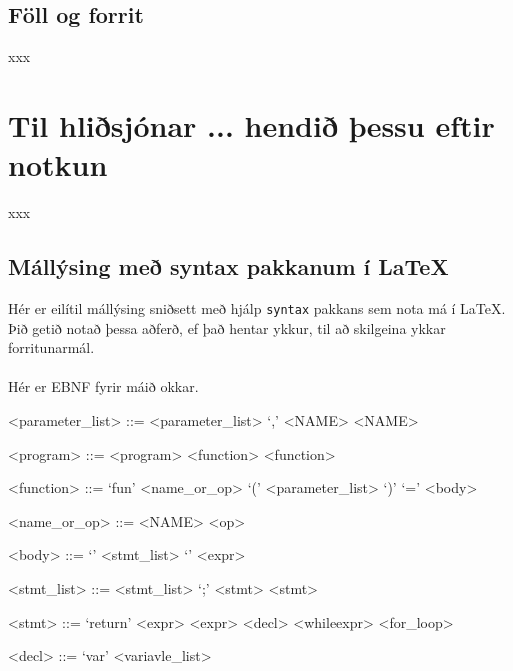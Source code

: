 \documentclass[12pt,a4paper]{article}
\begin{document}
\subsection{Föll og forrit}
xxx
\section{Til hliðsjónar ... hendið þessu eftir notkun}
xxx
\subsection{Mállýsing með syntax pakkanum í LaTeX}

Hér er eilítil mállýsing sniðsett með hjálp {\tt syntax} pakkans sem
nota má í \LaTeX. Þið getið notað þessa aðferð, ef það hentar ykkur,
til að skilgeina ykkar forritunarmál.
\\
\\
Hér er EBNF fyrir máið okkar.

\begin{grammar}
<parameter_list> ::= <parameter_list> `,' <NAME>
	\alt <NAME>
	\alt \epsilon
\end{grammar}

\begin{grammar}
<program> ::= <program> <function>
	\alt <function>
\end{grammar}

\begin{grammar}
<function> ::= `fun' <name_or_op> `(' <parameter_list> `)' `=' <body>
\end{grammar}

\begin{grammar}
<name_or_op> ::= <NAME>
	\alt <op>
\end{grammar}

\begin{grammar}
<body> ::= `{' <stmt_list> `}'
	\alt <expr>
\end{grammar}

\begin{grammar}
<stmt_list> ::= <stmt_list> `;' <stmt>
	\alt <stmt>
	\alt \epsilon
\end{grammar}

\begin{grammar}
<stmt> ::= `return' <expr>
	\alt <expr>
	\alt <decl>
	\alt <whileexpr>
	\alt <for_loop>
\end{grammar}

\begin{grammar}
<decl> ::= `var' <variavle_list> 
\end{grammar}
\end{document}

